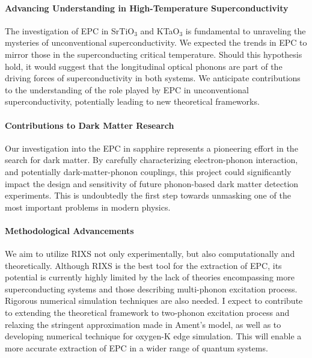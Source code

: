 \documentclass[11pt]{article}
\begin{document}
\paragraph{Advancing Understanding in High-Temperature Superconductivity}
The investigation of EPC in SrTiO$_{3}$ and KTaO$_{3}$ is fundamental to unraveling the mysteries of unconventional superconductivity.  We expected the trends in EPC to mirror those in the superconducting critical temperature. Should this hypothesis hold, it would suggest that the longitudinal optical phonons are part of the driving forces of superconductivity in both systems. We anticipate contributions to the understanding of the role played by EPC in unconventional superconductivity, potentially leading to new theoretical frameworks. 

\paragraph{Contributions to Dark Matter Research}
Our investigation into the EPC in sapphire represents a pioneering effort in the search for dark matter. By carefully characterizing electron-phonon interaction, and potentially dark-matter-phonon couplings, this project could significantly impact the design and sensitivity of future phonon-based dark matter detection experiments. 
This is undoubtedly the first step towards unmasking one of the most important problems in modern physics.

\paragraph{Methodological Advancements}
We aim to utilize RIXS not only experimentally, but also computationally and theoretically. Although RIXS is the best tool for the extraction of EPC, its potential is currently highly limited by the lack of theories encompassing more superconducting systems and those describing multi-phonon excitation process. Rigorous numerical simulation techniques are also needed. I expect to contribute to extending the theoretical framework to two-phonon excitation process and relaxing the stringent approximation made in Ament's model\cite{ament_resonant_2011}, as well as to developing numerical technique for oxygen-K edge simulation. This will enable a more accurate extraction of EPC in a wider range of quantum systems. 



\newpage


\end{document}

